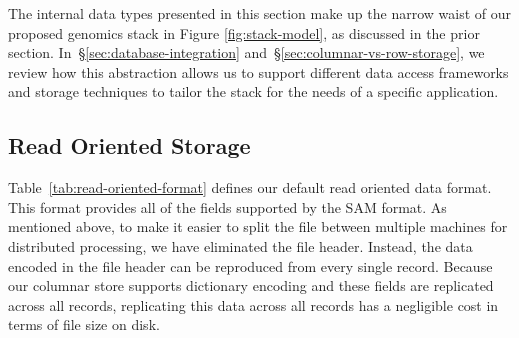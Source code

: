 \documentclass[10pt,twocolumn]{article}
\theoremstyle{plain}
\begin{document}
The internal data types presented in this section make up the narrow waist of our
proposed genomics stack in Figure \ref{fig:stack-model}, as discussed in the prior section. In~\S\ref{sec:database-integration} and~\S\ref{sec:columnar-vs-row-storage}, we review how this
abstraction allows us to support different data access frameworks and storage techniques to tailor the stack for the needs of
a specific application.

\subsection{Read Oriented Storage}
\label{sec:read-oriented-storage}

Table~\ref{tab:read-oriented-format} defines our default read oriented data format. This format provides all of the
fields supported by the SAM format. As mentioned above, to make it easier to split the file between multiple machines for distributed processing,
we have eliminated the file header. Instead, the data encoded in the file header can be reproduced from every single
record. Because our columnar store supports dictionary encoding and these fields are replicated across all records,
replicating this data across all records has a negligible cost in terms of file size on disk.
\end{document}
